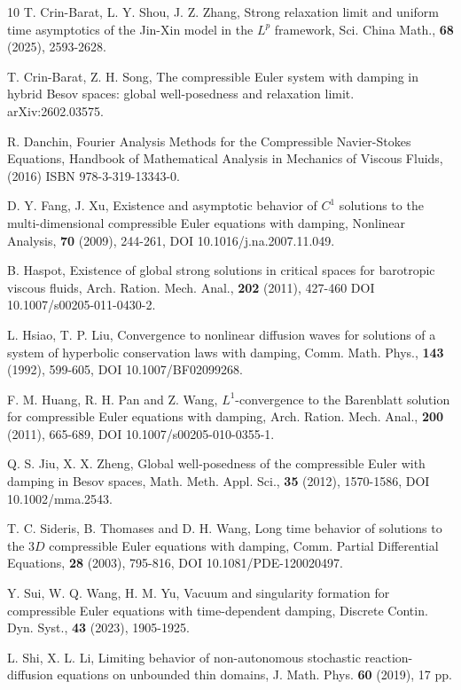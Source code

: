 \documentclass{amsart}
\theoremstyle{definition}
\theoremstyle{remark}
\numberwithin{equation}{section}
\begin{document}
\begin{thebibliography}{10}
T. Crin-Barat, L. Y. Shou, J. Z. Zhang, Strong relaxation limit and uniform time asymptotics of the Jin-Xin model in the $L^p$ framework, Sci. China Math., {\bf 68} (2025), 2593-2628.

T. Crin-Barat, Z. H. Song, The compressible Euler system with damping in hybrid Besov spaces: global well-posedness and relaxation limit. arXiv:2602.03575.

R. Danchin, Fourier Analysis Methods for the
Compressible Navier-Stokes Equations, Handbook of Mathematical Analysis in Mechanics of Viscous Fluids, (2016) ISBN 978-3-319-13343-0.

D. Y. Fang, J. Xu, Existence and asymptotic behavior of $C^1$ solutions to the multi-dimensional compressible Euler equations with damping, Nonlinear Analysis, {\bf70} (2009), 244-261, DOI 10.1016/j.na.2007.11.049.

B. Haspot, Existence of global strong solutions in critical spaces for barotropic viscous fluids, Arch. Ration. Mech. Anal., {\bf 202} (2011), 427-460
DOI 10.1007/s00205-011-0430-2.

L. Hsiao, T. P. Liu, Convergence to nonlinear diffusion waves for solutions of a system of hyperbolic conservation laws with damping, Comm. Math. Phys., {\bf 143} (1992), 599-605,  DOI 10.1007/BF02099268.

F. M. Huang, R. H. Pan and Z. Wang, $L^1$-convergence to the Barenblatt solution for compressible Euler equations with damping, Arch. Ration. Mech. Anal., {\bf 200} (2011), 665-689, DOI 10.1007/s00205-010-0355-1.



Q. S. Jiu, X. X. Zheng, Global well-posedness of the compressible Euler with damping in Besov spaces, Math. Meth. Appl. Sci., {\bf 35} (2012), 1570-1586, DOI 10.1002/mma.2543.

T. C. Sideris, B. Thomases and D. H. Wang, Long time behavior of solutions to the $3D$ compressible Euler equations with damping, Comm. Partial Differential Equations, {\bf 28} (2003), 795-816, DOI 10.1081/PDE-120020497.

Y. Sui, W. Q. Wang, H. M. Yu, Vacuum and singularity formation for compressible Euler equations with time-dependent damping, Discrete Contin. Dyn. Syst., {\bf 43} (2023), 1905-1925.

L. Shi, X. L. Li, Limiting behavior of non-autonomous stochastic reaction-diffusion equations on unbounded thin domains, J. Math. Phys. {\bf 60} (2019),  17 pp.


\end{thebibliography}
\end{document}
